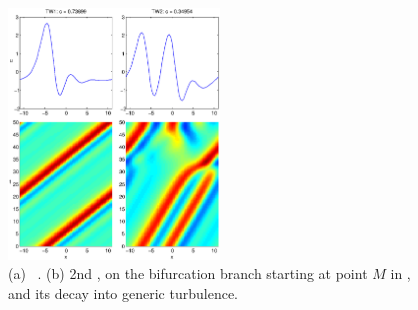 \begin{figure}[t]
\begin{center} 
    \includegraphics[width=0.50\textwidth]{figs/kse22_TW1_TW2.ps}
\end{center}
\caption{
(a)
    \Reqv\ .
(b)
2nd , on the bifurcation branch starting
at point $M$ in ,
and its decay into generic turbulence.
        }
\label{f:TW1TW2.ps}
\end{figure}

